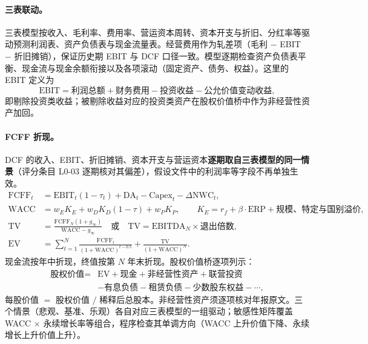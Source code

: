 \paragraph{三表联动。}三表模型按收入、毛利率、费用率、营运资本周转、资本开支与折旧、分红率等驱动预测利润表、资产负债表与现金流量表。经营费用作为轧差项（毛利 $-$ EBIT $-$ 折旧摊销），保证历史期 EBIT 与 DCF 口径一致。模型逐期检查资产负债表平衡、现金流与现金余额衔接以及各项滚动（固定资产、债务、权益）。这里的 EBIT 定义为
\begin{equation}
  \mathrm{EBIT} = \text{利润总额} + \text{财务费用} - \text{投资收益} - \text{公允价值变动收益},
\end{equation}
即剔除投资类收益；被剔除收益对应的投资类资产在股权价值桥中作为非经营性资产加回。

\paragraph{FCFF 折现。}DCF 的收入、EBIT、折旧摊销、资本开支与营运资本\textbf{逐期取自三表模型的同一情景}（评分条目 L0-03 逐期核对其偏差），假设文件中的利润率等字段不再单独生效。
\begin{align}
  \mathrm{FCFF}_t &= \mathrm{EBIT}_t(1-\tau_t) + \mathrm{DA}_t - \mathrm{Capex}_t - \Delta\mathrm{NWC}_t,\\
  \mathrm{WACC} &= w_E K_E + w_D K_D(1-\tau) + w_P K_P,\qquad K_E = r_f + \beta\cdot\mathrm{ERP} + \text{规模、特定与国别溢价},\\
  \mathrm{TV} &= \frac{\mathrm{FCFF}_N(1+g_\infty)}{\mathrm{WACC}-g_\infty}\quad\text{或}\quad \mathrm{TV}=\mathrm{EBITDA}_N\times \text{退出倍数},\\
  \mathrm{EV} &= \sum_{t=1}^{N}\frac{\mathrm{FCFF}_t}{(1+\mathrm{WACC})^{t-0.5}} + \frac{\mathrm{TV}}{(1+\mathrm{WACC})^{N}}.
\end{align}
现金流按年中折现，终值按第 $N$ 年末折现。股权价值桥逐项列示：
\begin{equation}
\begin{split}
  \text{股权价值} = {}& \mathrm{EV} + \text{现金} + \text{非经营性资产} + \text{联营投资}\\
  & - \text{有息负债} - \text{租赁负债} - \text{少数股东权益} - \cdots,
\end{split}
\end{equation}
每股价值 $=$ 股权价值 $/$ 稀释后总股本。非经营性资产须逐项核对年报原文。三个情景（悲观、基准、乐观）各自对应三表模型的一组驱动；敏感性矩阵覆盖 WACC × 永续增长率等组合，程序检查其单调方向（WACC 上升价值下降、永续增长上升价值上升）。

